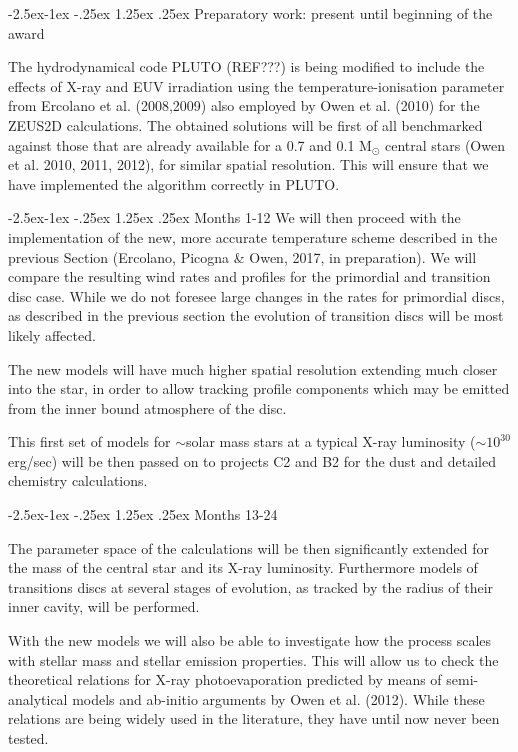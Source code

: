 \documentclass[10pt,fleqn,twoside]{article}
\makeatletter
\renewcommand\paragraph{\@startsection{paragraph}{4}{\z@}%
            {-2.5ex\@plus -1ex \@minus -.25ex}%
            {1.25ex \@plus .25ex}%
            {\normalfont\normalsize\bfseries}}
\makeatother
\begin{document}
\paragraph{Preparatory work: present until beginning of the award}

The hydrodynamical code PLUTO (REF???) is being modified to include the
effects of X-ray and EUV irradiation using the temperature-ionisation
parameter from Ercolano et al. (2008,2009) also employed by Owen et
al. (2010) for the ZEUS2D calculations. 
The obtained solutions will be first of all benchmarked against
those that are already available for a 0.7 and 0.1 M$_\odot$ central
stars (Owen et al. 2010, 2011, 2012), for similar spatial
resolution. This will ensure that we have implemented the algorithm
correctly in PLUTO. 

\paragraph{Months 1-12}
We will then proceed with the implementation of the new, more accurate
temperature scheme described in the previous Section (Ercolano,
Picogna \& Owen, 2017, in preparation). We will compare the resulting
wind rates and profiles for the primordial and transition disc
case. While we do not foresee large changes in the rates for
primordial discs, as described in the previous section the evolution of transition discs will be most
likely affected. 

The new models will have much higher spatial
resolution extending much closer into the star, in order to allow
tracking profile components which may be emitted from the inner bound
atmosphere of the disc. 

This first set of models for $\sim$solar mass stars at a typical X-ray
luminosity ($\sim 10^{30}$erg/sec) will be then passed on to projects
C2 and B2 for the dust and detailed chemistry calculations. 

\paragraph{Months 13-24}

The parameter space of the calculations will be then
significantly extended for the mass of the central star and its X-ray
luminosity. Furthermore models of transitions discs at several stages
of evolution, as tracked by the radius of their inner cavity, will be
performed. 

With the new models we will also be able to investigate how
the process scales with stellar mass and stellar emission
properties. This will allow us to check the
theoretical relations for X-ray photoevaporation 
predicted by means of semi-analytical models and ab-initio arguments
by Owen et al. (2012). While these relations are being widely used in
the literature, they have until now never been tested.\\
\end{document}
